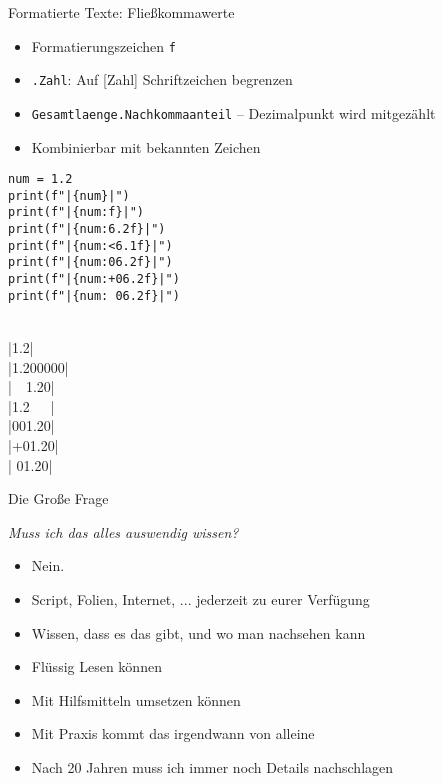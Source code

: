 \begin{frame}[fragile]{Formatierte Texte: Fließkommawerte}
%
\begin{itemize}
\item Formatierungszeichen \texttt{f}
\item \texttt{.Zahl}: Auf [Zahl] Schriftzeichen begrenzen
\item \texttt{Gesamtlaenge.Nachkommaanteil} -- Dezimalpunkt wird mitgezählt
\item Kombinierbar mit bekannten Zeichen
\end{itemize}
%
\vspace{-10pt}
\begin{minipage}[t]{.49\linewidth}
\phantom{x}
\begin{codebox}
\begin{verbatim}
num = 1.2
print(f"|{num}|")
print(f"|{num:f}|")
print(f"|{num:6.2f}|")
print(f"|{num:<6.1f}|")
print(f"|{num:06.2f}|")
print(f"|{num:+06.2f}|")
print(f"|{num: 06.2f}|")
\end{verbatim}
\end{codebox}
\end{minipage}
%
\begin{minipage}[t]{.49\linewidth}
\scriptsize\phantom{x}
\begin{cmdbox}
\phantom{x}\\
|1.2|\\
|1.200000|\\
|~~1.20|\\
|1.2~~~|\\
|001.20|\\
|+01.20|\\
| 01.20|
\end{cmdbox}
\end{minipage}
%
\end{frame}


\begin{frame}{Die Große Frage}
%
\begin{center}
\begin{Large}
\emph{Muss ich das alles auswendig wissen?}
\end{Large}
\end{center}
%
\begin{itemize}
\item Nein.
\item Script, Folien, Internet, ... jederzeit zu eurer Verfügung
\item Wissen, dass es das gibt, und wo man nachsehen kann
\item Flüssig Lesen können
\item Mit Hilfsmitteln umsetzen können
\item Mit Praxis kommt das irgendwann von alleine
\item Nach 20 Jahren muss ich immer noch Details nachschlagen
\end{itemize}
%
\end{frame}

